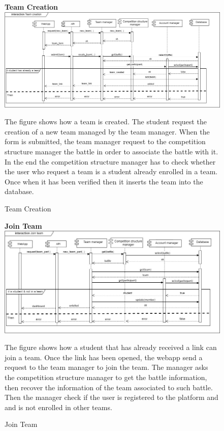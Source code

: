 \begin{enumerate}[label=\textbf{[UC\arabic*]}]
    \begin{figure}
    \item \textbf{Team Creation}
        \centering
        \includegraphics[width= \textwidth]{Images/Team_creation.jpg}
        \caption{Team Creation}
        \label{fig:enter-label}
        \raggedright The figure shows how a team is created. The student request the creation of a new team managed by the team manager. When the form is submitted, the team manager request to the competition structure manager the battle in order to associate the battle with it. In the end the competition structure manager has to check whether the user who request a team is a student already enrolled in a team. Once when it has been verified then it inserts the team into the database.
    \end{figure}
    
    \begin{figure}
    \item \textbf{Join Team}
        \centering
        \includegraphics[width= \textwidth]{Images/Join_team.jpg}
        \caption{Join Team}
        \label{fig:enter-label}
        \raggedright The figure shows how a student that has already received a link can join a team. Once the link has been opened, the webapp send a request to the team manager to join the team. The manager asks the competition structure manager to get the battle information, then recover the information of the team associated to such battle. Then the manager check if the user is registered to the platform and and is not enrolled in other teams.
    \end{figure}
    

\end{enumerate}
